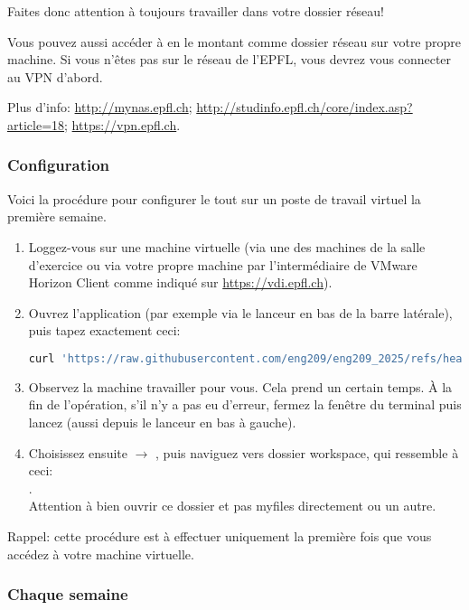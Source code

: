 \documentclass[10pt]{article}
\begin{document}
Faites donc attention à toujours travailler dans votre dossier réseau!

Vous pouvez aussi accéder à  en le montant comme dossier réseau sur votre propre machine. Si vous n'êtes pas sur le réseau de l'EPFL, vous devrez vous connecter au VPN d'abord.

Plus d'info: \url{http://mynas.epfl.ch}; \url{http://studinfo.epfl.ch/core/index.asp?article=18}; \url{https://vpn.epfl.ch}.

\subsubsection*{Configuration}

Voici la procédure pour configurer le tout sur un poste de travail virtuel la première semaine.
\begin{enumerate}
\item Loggez-vous sur une machine virtuelle (via une des machines de la salle d'exercice ou via votre propre machine par l'intermédiaire de VMware Horizon Client comme indiqué sur \url{https://vdi.epfl.ch}).
\item Ouvrez l'application  (par exemple via le lanceur en bas de la barre latérale), puis tapez exactement ceci:\\
\begin{lstlisting}[language=Bash]
curl 'https://raw.githubusercontent.com/eng209/eng209_2025/refs/heads/main/setup.sh' | bash -s
\end{lstlisting}
\item Observez la machine travailler pour vous. Cela prend un certain temps. À la fin de l'opération, s'il n'y a pas eu d'erreur, fermez la fenêtre du terminal puis lancez  (aussi depuis le lanceur en bas à gauche).
\item Choisissez ensuite  $\rightarrow$ , puis naviguez vers dossier workspace, qui ressemble à ceci:\\
.\\
Attention à bien ouvrir ce dossier et pas myfiles directement ou un autre.
\end{enumerate}

Rappel: cette procédure est à effectuer uniquement la première fois que vous accédez à votre machine virtuelle.

\subsubsection*{Chaque semaine}
\end{document}
